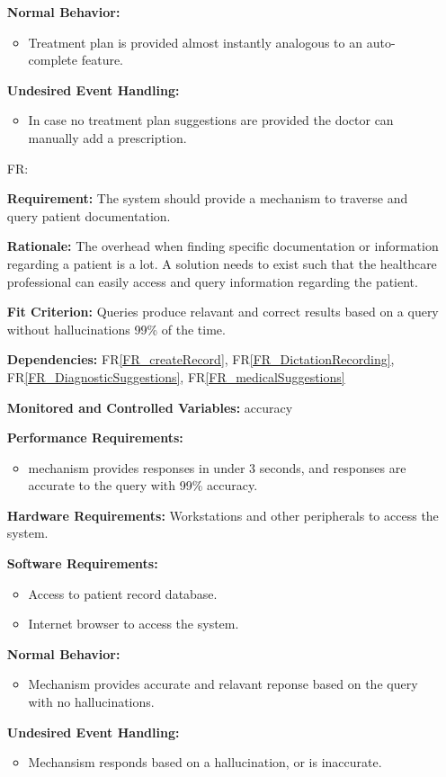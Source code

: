 \documentclass[12pt]{article}
\newcounter{reqnum} %
\begin{document}
\begin{itemize}
  \textbf{Normal Behavior:}
  \begin{itemize}
    \item Treatment plan is provided almost instantly analogous to an auto-complete feature.
  \end{itemize}
  
  \textbf{Undesired Event Handling:}
  \begin{itemize}
    \item In case no treatment plan suggestions are provided the doctor can manually add a prescription.
  \end{itemize}

  \item[FR\refstepcounter{reqnum}\thereqnum \label{FR_AIAssist}:] 
  
  \textbf{Requirement:} The system should provide a mechanism to traverse and query patient documentation.
  
  \textbf{Rationale:} The overhead when finding specific documentation or information regarding a patient is a lot. A solution needs to exist such that the healthcare professional can easily access and query information regarding the patient.
  
  \textbf{Fit Criterion:} Queries produce relavant and correct results based on a query without hallucinations 99\% of the time.
   
  \textbf{Dependencies:} FR\ref{FR_createRecord}, FR\ref{FR_DictationRecording}, FR\ref{FR_DiagnosticSuggestions}, FR\ref{FR_medicalSuggestions}
  
  \textbf{Monitored and Controlled Variables:} accuracy
  
  \textbf{Performance Requirements:}
  \begin{itemize}
    \item mechanism provides responses in under 3 seconds, and responses are accurate to the query with 99\% accuracy.
  \end{itemize}
  
  \textbf{Hardware Requirements:} 
  Workstations and other peripherals to access the system.
  
  \textbf{Software Requirements:}
  \begin{itemize}
    \item Access to patient record database.
    \item Internet browser to access the system. 
  \end{itemize}
  
  \textbf{Normal Behavior:}
  \begin{itemize}
    \item Mechanism provides accurate and relavant reponse based on the query with no hallucinations.
  \end{itemize}
  
  \textbf{Undesired Event Handling:}
  \begin{itemize}
    \item Mechansism responds based on a hallucination, or is inaccurate.
  \end{itemize}

\end{itemize}
\end{document}
